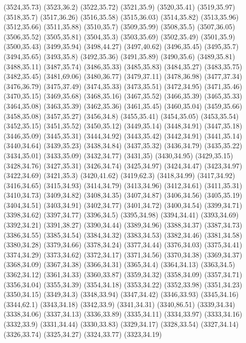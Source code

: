 (3524,35.73)
(3523,36.2)
(3522,35.72)
(3521,35.9)
(3520,35.41)
(3519,35.97)
(3518,35.7)
(3517,36.26)
(3516,35.58)
(3515,36.03)
(3514,35.82)
(3513,35.96)
(3512,35.66)
(3511,35.88)
(3510,35.7)
(3509,35.99)
(3508,35.5)
(3507,36.05)
(3506,35.52)
(3505,35.81)
(3504,35.3)
(3503,35.69)
(3502,35.49)
(3501,35.9)
(3500,35.43)
(3499,35.94)
(3498,44.27)
(3497,40.62)
(3496,35.45)
(3495,35.7)
(3494,35.65)
(3493,35.8)
(3492,35.36)
(3491,35.89)
(3490,35.6)
(3489,35.81)
(3488,35.11)
(3487,35.74)
(3486,35.33)
(3485,35.83)
(3484,35.27)
(3483,35.75)
(3482,35.45)
(3481,69.06)
(3480,36.77)
(3479,37.11)
(3478,36.98)
(3477,37.34)
(3476,36.79)
(3475,37.49)
(3474,35.33)
(3473,35.51)
(3472,34.95)
(3471,35.46)
(3470,35.15)
(3469,35.68)
(3468,35.16)
(3467,35.52)
(3466,35.39)
(3465,35.33)
(3464,35.08)
(3463,35.39)
(3462,35.36)
(3461,35.45)
(3460,35.04)
(3459,35.66)
(3458,35.08)
(3457,35.27)
(3456,34.8)
(3455,35.41)
(3454,35.05)
(3453,35.54)
(3452,35.15)
(3451,35.52)
(3450,35.12)
(3449,35.14)
(3448,34.91)
(3447,35.18)
(3446,35.09)
(3445,35.31)
(3444,34.92)
(3443,35.42)
(3442,34.91)
(3441,35.14)
(3440,34.64)
(3439,35.23)
(3438,34.84)
(3437,35.32)
(3436,34.79)
(3435,35.22)
(3434,35.01)
(3433,35.09)
(3432,34.77)
(3431,35)
(3430,34.95)
(3429,35.15)
(3428,34.76)
(3427,35.31)
(3426,34.74)
(3425,34.97)
(3424,34.47)
(3423,34.97)
(3422,34.69)
(3421,35.3)
(3420,41.62)
(3419,62.3)
(3418,34.99)
(3417,34.92)
(3416,34.65)
(3415,34.93)
(3414,34.79)
(3413,34.96)
(3412,34.61)
(3411,35.31)
(3410,34.73)
(3409,34.82)
(3408,34.35)
(3407,34.87)
(3406,34.56)
(3405,35.19)
(3404,34.51)
(3403,34.91)
(3402,34.77)
(3401,34.72)
(3400,34.54)
(3399,34.71)
(3398,34.62)
(3397,34.77)
(3396,34.5)
(3395,34.98)
(3394,34.41)
(3393,34.69)
(3392,34.21)
(3391,38.27)
(3390,34.44)
(3389,34.96)
(3388,34.37)
(3387,34.73)
(3386,34.55)
(3385,34.54)
(3384,34.32)
(3383,34.53)
(3382,34.46)
(3381,34.58)
(3380,34.28)
(3379,34.66)
(3378,34.24)
(3377,34.44)
(3376,34.03)
(3375,34.41)
(3374,34.29)
(3373,34.62)
(3372,34.17)
(3371,34.56)
(3370,34.38)
(3369,34.37)
(3368,34.09)
(3367,34.38)
(3366,34.31)
(3365,34.4)
(3364,34.13)
(3363,34.5)
(3362,34.12)
(3361,34.33)
(3360,33.87)
(3359,34.32)
(3358,34.09)
(3357,34.71)
(3356,34.04)
(3355,34.39)
(3354,34.18)
(3353,34.22)
(3352,33.98)
(3351,34.23)
(3350,34.15)
(3349,34.3)
(3348,33.94)
(3347,34.42)
(3346,33.93)
(3345,34.16)
(3344,62.1)
(3343,34.18)
(3342,33.9)
(3341,34.31)
(3340,86.51)
(3339,34.34)
(3338,34.06)
(3337,34.13)
(3336,33.89)
(3335,34.11)
(3334,33.97)
(3333,34.16)
(3332,33.9)
(3331,34.44)
(3330,33.83)
(3329,34.17)
(3328,33.54)
(3327,34.14)
(3326,33.74)
(3325,34.27)
(3324,33.77)
(3323,34.19)
